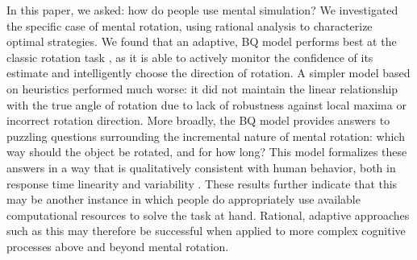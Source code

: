 \documentclass{article} %
\begin{document}
In this paper, we asked: how do people use mental simulation?  We
investigated the specific case of mental rotation, using rational
analysis to characterize optimal strategies. We found that an
adaptive, BQ model performs best at the classic rotation task
\cite{Shepard1971}, as it is able to actively monitor the confidence
of its estimate and intelligently choose the direction of rotation. A
simpler model based on heuristics performed much worse: it did not
maintain the linear relationship with the true angle of rotation due
to lack of robustness against local maxima or incorrect rotation
direction.  More broadly, the BQ model provides answers to puzzling
questions surrounding the incremental nature of mental rotation: which
way should the object be rotated, and for how long? This model
formalizes these answers in a way that is qualitatively consistent
with human behavior, both in response time linearity
\cite{Shepard1971} and variability \cite{Just1976}. These results
further indicate that this may be another instance in which people do
appropriately use available computational resources to solve the task
at hand.  Rational, adaptive approaches such as this may therefore be
successful when applied to more complex cognitive processes above and
beyond mental rotation.


\renewcommand\refname{\normalsize{References}}

{\small }
\end{document}
